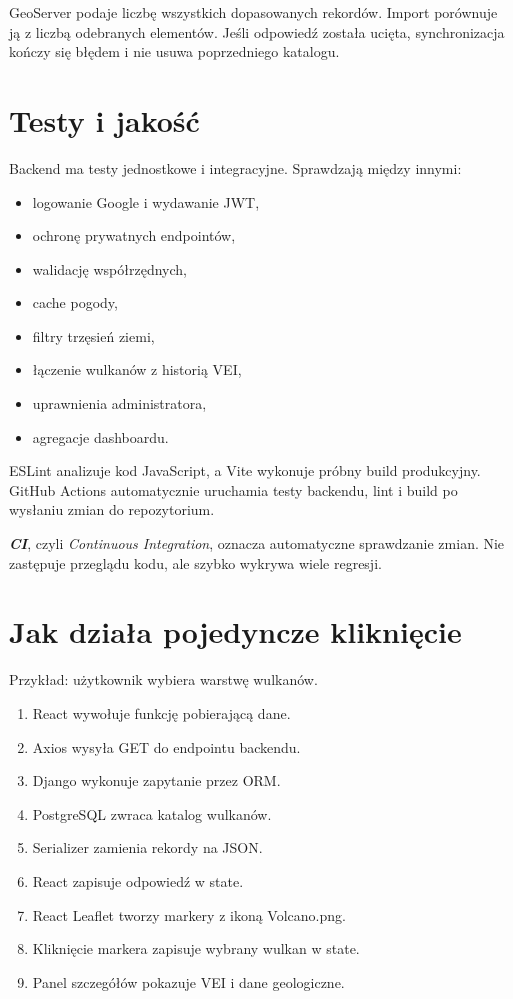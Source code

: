 \documentclass[14pt,a5paper,oneside]{extarticle}
\newcommand{\term}[1]{\textbf{\textit{#1}}}
\begin{document}
GeoServer podaje liczbę wszystkich dopasowanych rekordów. Import porównuje ją
z liczbą odebranych elementów. Jeśli odpowiedź została ucięta, synchronizacja
kończy się błędem i nie usuwa poprzedniego katalogu.

\section{Testy i jakość}

Backend ma testy jednostkowe i integracyjne. Sprawdzają między innymi:

\begin{itemize}
  \item logowanie Google i wydawanie JWT,
  \item ochronę prywatnych endpointów,
  \item walidację współrzędnych,
  \item cache pogody,
  \item filtry trzęsień ziemi,
  \item łączenie wulkanów z historią VEI,
  \item uprawnienia administratora,
  \item agregacje dashboardu.
\end{itemize}

ESLint analizuje kod JavaScript, a Vite wykonuje próbny build produkcyjny.
GitHub Actions automatycznie uruchamia testy backendu, lint i build po
wysłaniu zmian do repozytorium.

\term{CI}, czyli \textit{Continuous Integration}, oznacza automatyczne
sprawdzanie zmian. Nie zastępuje przeglądu kodu, ale szybko wykrywa wiele
regresji.

\section{Jak działa pojedyncze kliknięcie}

Przykład: użytkownik wybiera warstwę wulkanów.

\begin{enumerate}
  \item React wywołuje funkcję pobierającą dane.
  \item Axios wysyła GET do endpointu backendu.
  \item Django wykonuje zapytanie przez ORM.
  \item PostgreSQL zwraca katalog wulkanów.
  \item Serializer zamienia rekordy na JSON.
  \item React zapisuje odpowiedź w state.
  \item React Leaflet tworzy markery z ikoną Volcano.png.
  \item Kliknięcie markera zapisuje wybrany wulkan w state.
  \item Panel szczegółów pokazuje VEI i dane geologiczne.
\end{enumerate}
\end{document}

